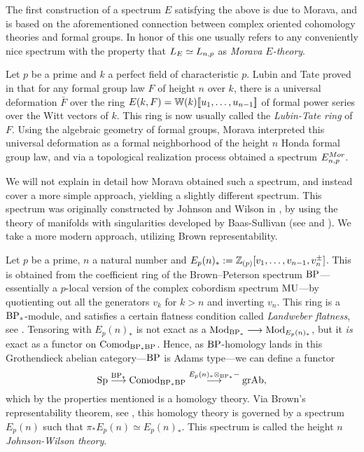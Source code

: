 The first construction of a spectrum $E$ satisfying the above is due to Morava, and is based on the aforementioned connection between complex oriented cohomology theories and formal groups. In honor of this one usually refers to any conveniently nice spectrum with the property that $L_E \simeq L_{n,p}$ as \emph{Morava $E$-theory}.

\begin{construction}
    Let $p$ be a prime and $k$ a perfect field of characteristic $p$. Lubin and Tate proved in \cite{lubin-tate_66} that for any formal group law $F$ of height $n$ over $k$, there is a universal deformation $\bar{F}$ over the ring $E(k, F)=\mathbb{W}(k)[\![ u_1, \ldots, u_{n-1}]\!]$ of formal power series over the Witt vectors of $k$. This ring is now usually called the \emph{Lubin-Tate ring} of $F$. Using the algebraic geometry of formal groups, Morava interpreted this universal deformation as a formal neighborhood of the height $n$ Honda formal group law, and via a topological realization process obtained a spectrum $E^{Mor}_{n,p}$.
\end{construction}

We will not explain in detail how Morava obtained such a spectrum, and instead cover a more simple approach, yielding a slightly different spectrum. This spectrum was originally constructed by Johnson and Wilson in \cite{johnson-wilson_75}, by using the theory of manifolds with singularities developed by Baas-Sullivan (see \cite{baas_73a} and \cite{baas_73b}). We take a more modern approach, utilizing Brown representability. 

\begin{construction}
    Let $p$ be a prime, $n$ a natural number and $E_p(n)_* := \mathbb{Z}_{(p)}[v_1, \ldots, v_{n-1}, v_n^{\pm}]$. This is obtained from the coefficient ring of the Brown--Peterson spectrum $\mathrm{BP}$---essentially a $p$-local version of the complex cobordism spectrum $\mathrm{MU}$---by quotienting out all the generators $v_k$ for $k>n$ and inverting $v_n$. This ring is a $\mathrm{BP}_*$-module, and satisfies a certain flatness condition called \emph{Landweber flatness}, see \cite{landweber_76}. Tensoring with $E_p(n)_*$ is not exact as a $\mathrm{Mod}_{\mathrm{BP}_*}\longrightarrow \mathrm{Mod}_{E_p(n)_*}$, but it \emph{is} exact as a functor on $\mathrm{Comod}_{\mathrm{BP}_*\mathrm{BP}}$. Hence, as $\mathrm{BP}$-homology lands in this Grothendieck abelian category---$\mathrm{BP}$ is Adams type---we can define a functor 
    \[\mathrm{Sp} \overset{\mathrm{BP}_*}{\longrightarrow} \mathrm{Comod}_{\mathrm{BP}_*\mathrm{BP}}\overset{E_p(n)_*\otimes_{\mathrm{BP}_*}-}{\longrightarrow} \mathrm{gr}\mathrm{Ab},\]
    which by the properties mentioned is a homology theory. Via Brown's representability theorem, see \cite[Theorem 1]{brown_1962}, this homology theory is governed by a spectrum $E_p(n)$ such that $\pi_* E_p(n) \simeq E_p(n)_*$. This spectrum is called the height $n$ \emph{Johnson-Wilson theory}. 
\end{construction}

